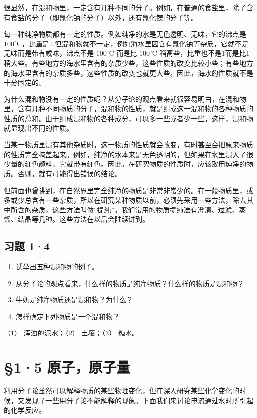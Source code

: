 很显然，在混和物里，一定含有几种不同的分子。例如，在普通的食盐里，除了含有食盐的分子（即氯化钠的分子）以外，还有氯化镁的分子等。

每一种纯净物质都有一定的性质。例如纯净的水是无色透明、无味，它的沸点是
\(100^{\circ}\mathrm{C}\)，比重是1.但混和物就不一定，例如海水里因含有氯化钠等杂质，它就不是无味而是带有咸味，沸点不是
\(100^{\circ}\mathrm{C}\) 而是比 \(100^{\circ}\mathrm{C}\)
稍高些，比重也不是1而是比1稍大些。有些地方的海水里含有的杂质少些，这些性质的改变比较小些；有些地方的海水里含有的杂质多些，这些性质的改变也就更大些。因此，海水的性质就不是十分固定的。

为什么混和物没有一定的性质呢？从分子论的观点看来就很容易明白，在混和物里，含有几种不同物质的分子，混和物的性质，就是组成这一混和物的各种物质的性质的总和。由于组成混和物的各种成分，可以多一些或者少一些，这样，混和物就显现出不同的性质。

当某一物质里混有其他杂质时，这一物质的性质就会改变，有时甚至会把原来物质的性质完全掩盖起来。例如，纯净的水本来是无色透明的，但如果在水里混入了很少量的红色颜料，它就带有红色。因此，在研究物质的性质时，应该取用纯净的物质。否则，就有可能得出错误的结论。

但前面也曾讲到，在自然界里完全纯净的物质是非常非常少的。在一般物质里，或多或少总含有一些杂质，所以在研究某种物质以前，必须先采用一些方法，除去其中所含的杂质，这些方法叫做``提纯''。我们常用的物质提纯法有澄清、过滤、蒸馏、结晶等几种。这些方法在以后会陆续讲到。

\subsection{习题 1·4}

\begin{enumerate}
\item
  试举出五种混和物的例子。
\item
  从分子论的观点看来，什么样的物质是纯净物质？什么样的物质是混和物？
\item
  牛奶是纯净物质还是混和物？为什么？
\item
  怎样确定下列物质是一个混和物？
\end{enumerate}

（1） 浑浊的泥水；（2） 土壤；（3） 糖水。

\section{§1·5 原子，原子量}

利用分子论虽然可以解释物质的某些物理变化，但在深入研究某些化学变化的时候，又发现了一些用分子论不能解释的现象。下面我们来讨论电流通过水时所引起的化学反应。

